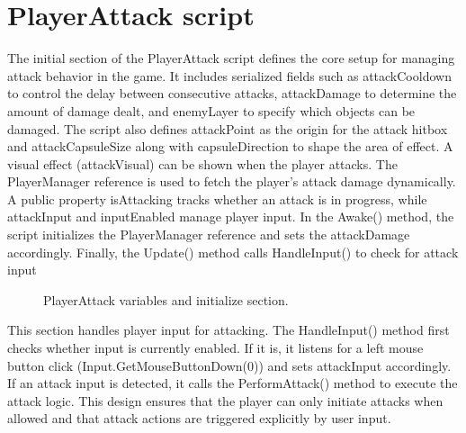 \documentclass[12pt,oneside,openright,a4paper]{cpe-english-project}
\begin{document}
\section{PlayerAttack script}
The initial section of the PlayerAttack script defines the core setup for managing attack behavior in the game. It includes serialized fields such as attackCooldown to control the delay between consecutive attacks, attackDamage to determine the amount of damage dealt, and enemyLayer to specify which objects can be damaged. The script also defines attackPoint as the origin for the attack hitbox and attackCapsuleSize along with capsuleDirection to shape the area of effect. A visual effect (attackVisual) can be shown when the player attacks. The PlayerManager reference is used to fetch the player's attack damage dynamically. A public property isAttacking tracks whether an attack is in progress, while attackInput and inputEnabled manage player input. In the Awake() method, the script initializes the PlayerManager reference and sets the attackDamage accordingly. Finally, the Update() method calls HandleInput() to check for attack input\par
 \begin{figure}[!h]
 \centering
\caption{PlayerAttack variables and initialize section.}\label{fig:vai}
\end{figure}
This section handles player input for attacking. The HandleInput() method first checks whether input is currently enabled. If it is, it listens for a left mouse button click (Input.GetMouseButtonDown(0)) and sets attackInput accordingly. If an attack input is detected, it calls the PerformAttack() method to execute the attack logic. This design ensures that the player can only initiate attacks when allowed and that attack actions are triggered explicitly by user input.\par
\end{document}
